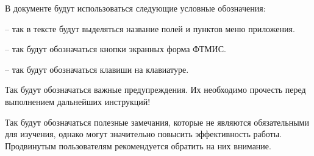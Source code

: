 В документе будут использоваться следующие условные обозначения:  \vspace*{0.5em}
 
  -- так в тексте будут выделяться название полей и пунктов меню приложения.
 
  -- так будут обозначаться кнопки экранных форма ФТМИС.
 
  -- так будут обозначаться клавиши на клавиатуре.
 
 \begin{vnim}
  Так будут обозначаться важные предупреждения. Их необходимо прочесть перед выполнением дальнейших инструкций!
 \end{vnim}
 
 \begin{prim}
 Так будут обозначаться полезные замечания, которые не являются обязательными для изучения, однако могут значительно повысить эффективность работы. Продвинутым пользователям рекомендуется обратить на них внимание.
 \end{prim}
